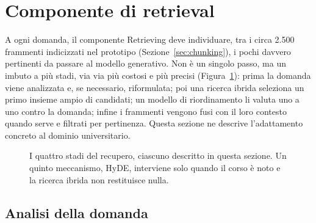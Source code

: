 \section{Componente di retrieval}\label{sec:retrieval}

A ogni domanda, il componente Retrieving deve individuare, tra i circa 2.500 frammenti indicizzati nel prototipo
(Sezione~\ref{sec:chunking}), i pochi davvero pertinenti da passare al modello generativo. Non è un singolo passo,
ma un imbuto a più stadi, via via più costosi e più precisi (Figura~\ref{fig:imbuto-retrieval}): prima la domanda
viene analizzata e, se necessario, riformulata; poi una ricerca ibrida seleziona un primo insieme ampio di
candidati; un modello di riordinamento li valuta uno a uno contro la domanda; infine i frammenti vengono fusi con
il loro contesto quando serve e filtrati per pertinenza. Questa sezione ne descrive l'adattamento concreto al dominio universitario.

\begin{figure}[H]
  \centering
  \caption{I quattro stadi del recupero, ciascuno descritto in questa sezione. Un quinto meccanismo, HyDE,
  interviene solo quando il corso è noto e la ricerca ibrida non restituisce
  nulla.}
  \label{fig:imbuto-retrieval}
\end{figure}

\subsection{Analisi della domanda}\label{sec:analisi-domanda}

